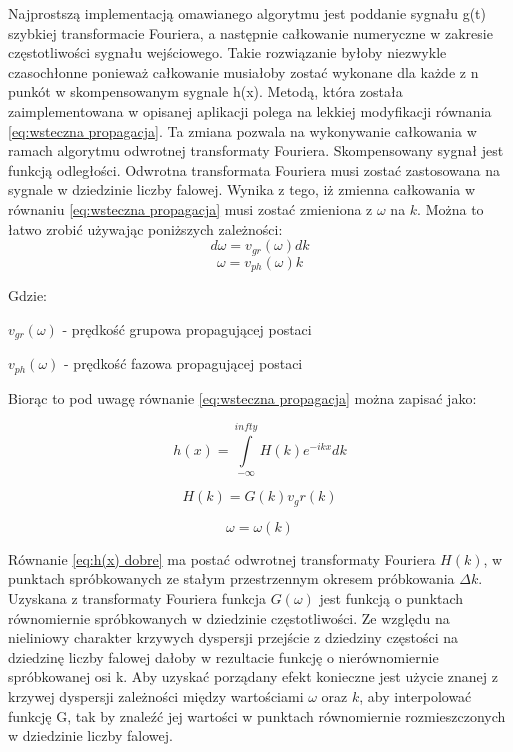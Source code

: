 Najprostszą implementacją omawianego algorytmu jest poddanie sygnału g(t) szybkiej transformacie Fouriera, a następnie całkowanie numeryczne w zakresie częstotliwości sygnału wejściowego. Takie rozwiązanie byłoby niezwykle czasochłonne ponieważ całkowanie musiałoby zostać wykonane dla każde z n punkót w skompensowanym sygnale h(x). Metodą, która została zaimplementowana w opisanej aplikacji polega na lekkiej modyfikacji równania \ref{eq:wsteczna propagacja}. Ta zmiana pozwala na wykonywanie całkowania w ramach algorytmu odwrotnej transformaty Fouriera. Skompensowany sygnał jest funkcją odległości. Odwrotna transformata Fouriera musi zostać zastosowana na sygnale w dziedzinie liczby falowej. Wynika z tego, iż zmienna całkowania w równaniu \ref{eq:wsteczna propagacja} musi zostać zmieniona z $\omega$ na $k$. Można to łatwo zrobić używając poniższych zależności:
\begin{equation}
d\omega = v_{gr}(\omega)dk
\end{equation}
\begin{equation}
\omega = v_{ph}(\omega)k
\end{equation}

Gdzie:

$v_{gr}(\omega)$ - prędkość grupowa propagującej postaci

$v_{ph}(\omega)$ - prędkość fazowa propagującej postaci

Biorąc to pod uwagę równanie \ref{eq:wsteczna propagacja} można zapisać jako:


\begin{equation}
h(x) = \int\limits_{-\infty}^{infty}H(k)e^{-ikx}dk \label{eq:h(x) dobre}
\end{equation}

\begin{equation}
H(k) = G(k)v_gr(k)
\end{equation}

$$
\omega = \omega(k)
$$

Równanie \ref{eq:h(x) dobre} ma postać odwrotnej transformaty Fouriera $H(k)$, w punktach spróbkowanych ze stałym przestrzennym okresem próbkowania $\Delta k$. Uzyskana z transformaty Fouriera funkcja $G(\omega)$ jest funkcją o punktach równomiernie spróbkowanych w dziedzinie częstotliwości. Ze względu na nieliniowy charakter krzywych dyspersji przejście z dziedziny częstości na dziedzinę liczby falowej dałoby w rezultacie funkcję o nierównomiernie spróbkowanej osi k. Aby uzyskać porządany efekt konieczne jest użycie znanej z krzywej dyspersji zależności między wartościami $\omega$ oraz $k$, aby interpolować funkcję G, tak by znaleźć jej wartości w punktach równomiernie rozmieszczonych w dziedzinie liczby falowej.


